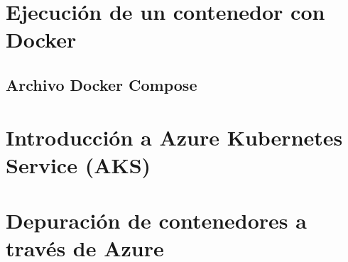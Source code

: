 \documentclass[11pt,spanish,listoffigures]{tfgetsinf}
\begin{document}
\section{Ejecución de un contenedor con Docker}

\subsection{Archivo Docker Compose}

\section{Introducción a Azure Kubernetes Service (AKS)}

\section{Depuración de contenedores a través de Azure}
\end{document}
